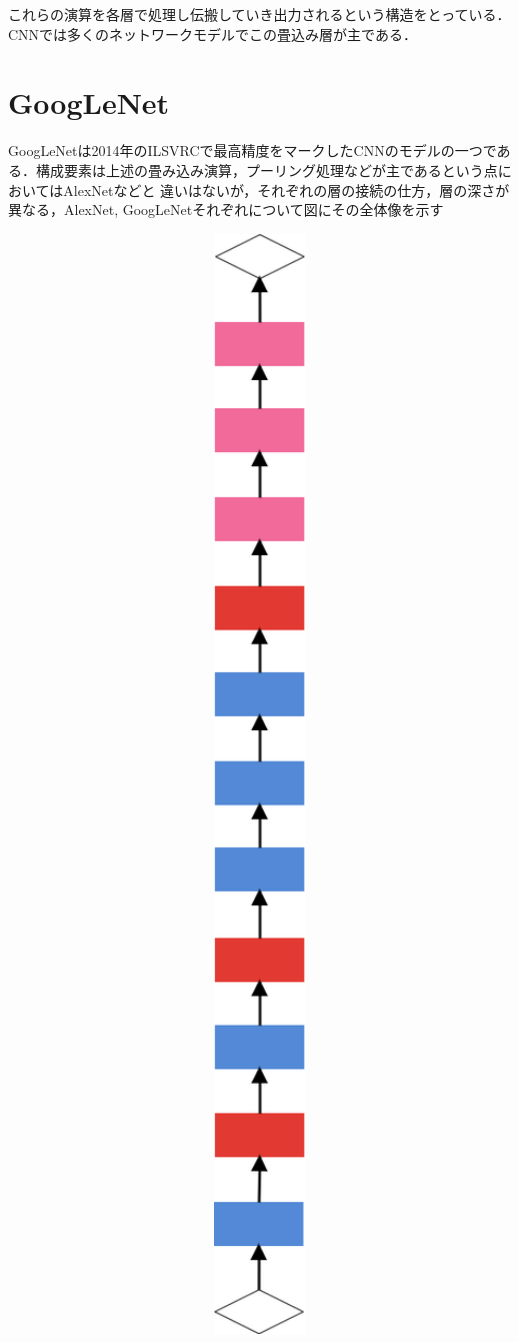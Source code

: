 {これらの演算を各層で処理し伝搬していき出力されるという構造をとっている．
CNNでは多くのネットワークモデルでこの畳込み層が主である．

\section{GoogLeNet}
\label{sec:googlenet}
GoogLeNetは2014年のILSVRCで最高精度をマークしたCNNのモデルの一つである．構成要素は上述の畳み込み演算，プーリング処理などが主であるという点においてはAlexNetなどと
違いはないが，それぞれの層の接続の仕方，層の深さが異なる，AlexNet, GoogLeNetそれぞれについて図にその全体像を示す

\begin{figure}[h]
  \centering
  \includegraphics[width=12cm]{./chap2/fig/alexnet.png}

\end{figure}}
